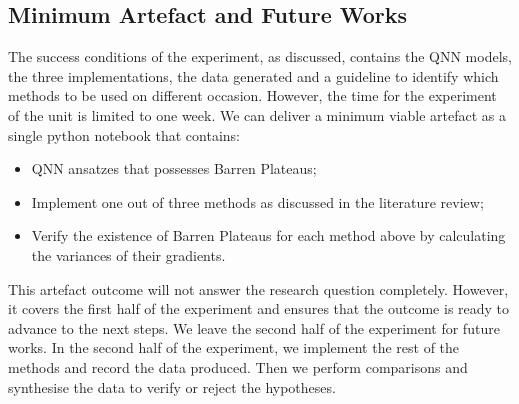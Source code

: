 \subsection{Minimum Artefact and Future Works}

The success conditions of the experiment, as discussed, contains the QNN models, the three implementations, the data generated and a guideline to identify which methods to be used on different occasion.
However, the time for the experiment of the unit is limited to one week. We can deliver a minimum viable artefact as a single python notebook that contains:
\begin{itemize}
    \item QNN ansatzes that possesses Barren Plateaus;
    \item Implement one out of three methods as discussed in the literature review;
    \item Verify the existence of Barren Plateaus for each method above by calculating the variances of their gradients.
\end{itemize}

This artefact outcome will not answer the research question completely.
However, it covers the first half of the experiment and ensures that the outcome is ready to advance to the next steps.
We leave the second half of the experiment for future works.
In the second half of the experiment, we implement the rest of the methods and record the data produced.
Then we perform comparisons and synthesise the data to verify or reject the hypotheses.
